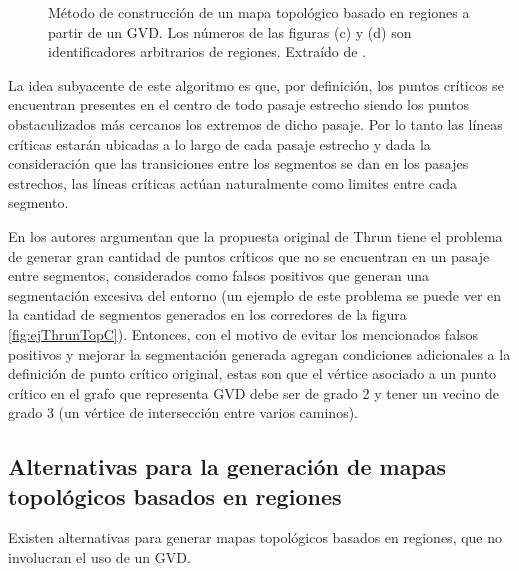 \begin{figure}[H]
  \caption[Método de construcción de un mapa topológico basado en regiones a partir de un GVD.]{Método de construcción de un mapa topológico basado en regiones a partir de un GVD. Los números de las figuras (c) y (d) son identificadores arbitrarios de regiones. Extraído de \cite{Thrun1998}.}\label{fig:ejThrunTop}
\end{figure}

La idea subyacente de este algoritmo es que, por definición, los puntos críticos se encuentran presentes en el centro de todo pasaje estrecho siendo los puntos obstaculizados más cercanos los extremos de dicho pasaje. Por lo tanto las líneas críticas estarán ubicadas a lo largo de cada pasaje estrecho y dada la consideración que las transiciones entre los segmentos se dan en los pasajes estrechos, las líneas críticas actúan naturalmente como limites entre cada segmento.


En \cite{wurm2008coordinated} los autores argumentan que la propuesta original de Thrun tiene el problema de generar gran cantidad de puntos críticos que no se encuentran en un pasaje entre segmentos, considerados como falsos positivos que generan una segmentación excesiva del entorno (un ejemplo de este problema se puede ver en la cantidad de segmentos generados en los corredores de la figura \ref{fig:ejThrunTopC}). Entonces, con el motivo de evitar los mencionados falsos positivos y mejorar la segmentación generada agregan condiciones adicionales a la definición de punto crítico original, estas son que el vértice asociado a un punto crítico en el grafo que representa GVD debe ser de grado 2 y tener un vecino de grado 3 (un vértice de intersección entre varios caminos). 

\subsection[Alternativas para la generación de mapas topológicos basados en regiones]{Alternativas para la generación de mapas topológicos basados en regiones}\label{subsec:mapaTopAlt}

Existen alternativas para generar mapas topológicos basados en regiones, que no
involucran el uso de un GVD.

